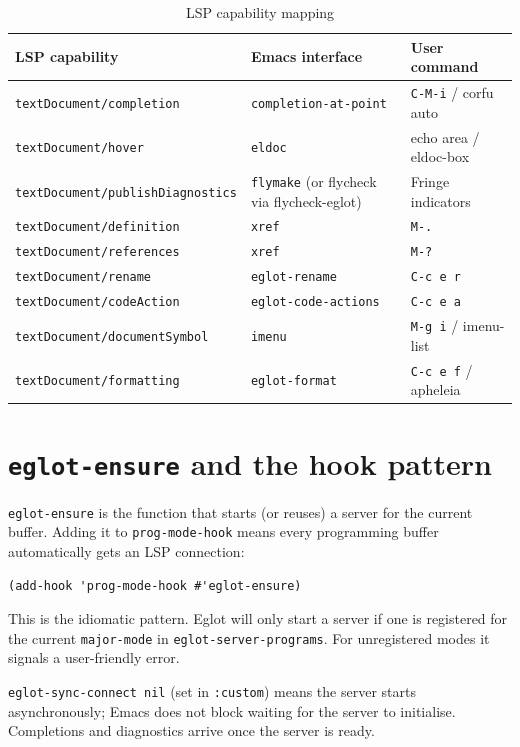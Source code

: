\begin{table}
\centering
\caption{LSP capability mapping}
\label{tab:lsp-capabilities}
\begin{tabularx}{\linewidth}{@{}XlX@{}}
\toprule
LSP capability & Emacs interface & User command \\
\midrule
\texttt{textDocument/completion} & \texttt{completion-at-point} & \texttt{C-M-i} / corfu auto \\
\texttt{textDocument/hover} & \texttt{eldoc} & echo area / eldoc-box \\
\texttt{textDocument/publishDiagnostics} & \texttt{flymake} (or flycheck via flycheck-eglot) & Fringe indicators \\
\texttt{textDocument/definition} & \texttt{xref} & \texttt{M-.} \\
\texttt{textDocument/references} & \texttt{xref} & \texttt{M-?} \\
\texttt{textDocument/rename} & \texttt{eglot-rename} & \texttt{C-c e r} \\
\texttt{textDocument/codeAction} & \texttt{eglot-code-actions} & \texttt{C-c e a} \\
\texttt{textDocument/documentSymbol} & \texttt{imenu} & \texttt{M-g i} / imenu-list \\
\texttt{textDocument/formatting} & \texttt{eglot-format} & \texttt{C-c e f} / apheleia \\
\bottomrule
\end{tabularx}
\end{table}

\section{\texttt{eglot-ensure} and the hook pattern}\label{eglot-ensure-and-the-hook-pattern}

\texttt{eglot-ensure} is the function that starts (or reuses) a server for the current buffer. Adding it to \texttt{prog-mode-hook} means every programming buffer automatically gets an LSP connection:

\begin{verbatim}
(add-hook 'prog-mode-hook #'eglot-ensure)
\end{verbatim}

This is the idiomatic pattern. Eglot will only start a server if one is registered for the current \texttt{major-mode} in \texttt{eglot-server-programs}. For unregistered modes it signals a user-friendly error.

\texttt{eglot-sync-connect nil} (set in \texttt{:custom}) means the server starts asynchronously; Emacs does not block waiting for the server to initialise. Completions and diagnostics arrive once the server is ready.

